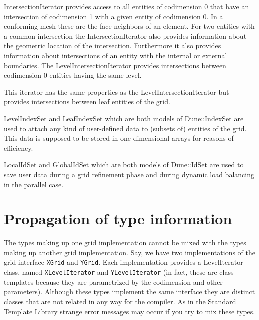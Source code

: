 \documentclass[11pt,a4paper,headinclude,footinclude,DIV16,normalheadings]{scrreprt}
\begin{document}

    IntersectionIterator provides access to all entities of
    codimension 0 that have an intersection of codimension 1 with a
    given entity of codimension 0. In a conforming mesh these are the
    face neighbors of an element. For two entities with a common
    intersection the IntersectionIterator also provides information
    about the geometric location of the intersection. Furthermore it
    also provides information about intersections of an entity with
    the internal or external boundaries. 
    The LevelIntersectionIterator provides intersections between
    codimension 0 entities having the same level.  
    

    This iterator has the same properties as the LevelIntersectionIterator
    but provides intersections between leaf entities of the grid.


    LevelIndexSet and LeafIndexSet which are both models of
    Dune::IndexSet are used to attach any kind of user-defined data to
    (subsets of) entities of the grid. This data is supposed to be
    stored in one-dimensional arrays for reasons of efficiency. 


    LocalIdSet and GlobalIdSet which are both models of Dune::IdSet
    are used to save user data during a grid refinement phase and
    during dynamic load balancing in the parallel case. 


\section{Propagation of type information}

The types making up one grid implementation cannot be mixed with the
types making up another grid implementation. Say, we have two
implementations of the grid interface \lstinline!XGrid! and
\lstinline!YGrid!. Each implementation provides a LevelIterator
class, named \lstinline!XLevelIterator! and
\lstinline!YLevelIterator! (in fact, these are class templates because
they are parametrized by the codimension and other
parameters). Although these types implement the same interface they
are distinct classes that are not related in any way for the
compiler. As in the Standard Template Library strange error messages
may occur if you try to mix these types.
\end{document}
